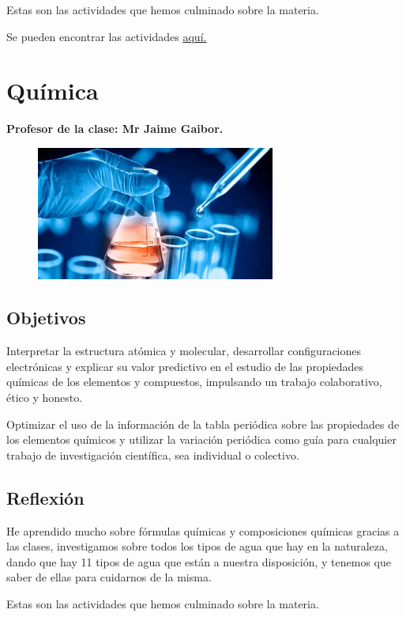 \documentclass[a4paper, 12pt]{article}
\begin{document}
Estas son las actividades que hemos culminado sobre la materia.

Se pueden encontrar las actividades \href{https://drive.google.com/drive/folders/1YKD8CT8OZtmeYhkY7_T-5Bcr-CvnnMNm?usp=sharing}{\underline{aquí.}}

\section{Química}
\textbf{Profesor de la clase: Mr Jaime Gaibor.}

\begin{figure}[h]
  \includegraphics[width=0.7\textwidth, center]{quimica.jpeg}
\end{figure}

\subsection{Objetivos}
Interpretar la estructura atómica y molecular, desarrollar configuraciones electrónicas y explicar su valor predictivo en el estudio de las propiedades químicas de los elementos y compuestos, impulsando un trabajo colaborativo, ético y honesto.

Optimizar el uso de la información de la tabla periódica sobre las propiedades de los elementos químicos y utilizar la variación periódica como guía para cualquier trabajo de investigación científica, sea individual o colectivo.

\subsection{Reflexión}
He aprendido mucho sobre fórmulas químicas y composiciones químicas gracias a las clases, investigamos sobre todos los tipos de agua que hay en la naturaleza, dando que hay 11 tipos de agua que están a nuestra disposición, y tenemos que saber de ellas para cuidarnos de la misma.

Estas son las actividades que hemos culminado sobre la materia.
\end{document}
